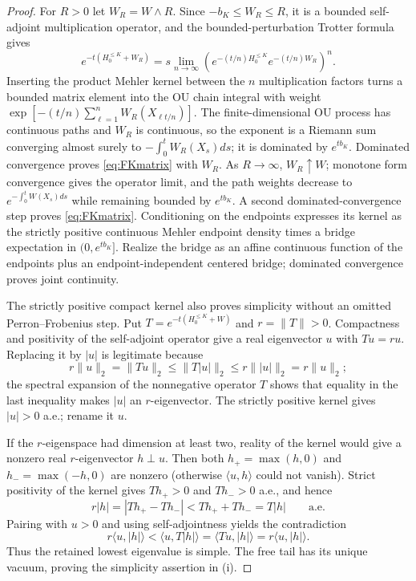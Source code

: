 \documentclass[11pt,a4paper]{article}
\theoremstyle{plain}
\theoremstyle{definition}
\begin{document}
\begin{proof}
For $R>0$ let $W_R=W\wedge R$.  Since $-b_K\le W_R\le R$, it is a bounded
self-adjoint multiplication operator, and the bounded-perturbation Trotter formula
gives
\begin{equation}
 e^{-t(H_0^{\le K}+W_R)}
 =s\!\!\lim_{n\to\infty}
   (e^{-(t/n)H_0^{\le K}}e^{-(t/n)W_R})^n .                        \label{eq:finite-trotter}
\end{equation}
Inserting the product Mehler kernel between the $n$ multiplication factors turns
a bounded matrix element into the OU chain integral with weight
$\exp[-(t/n)\sum_{\ell=1}^nW_R(X_{\ell t/n})]$.  The finite-dimensional OU
process has continuous paths and $W_R$ is continuous, so the exponent is a Riemann
sum converging almost surely to $-\int_0^tW_R(X_s)ds$; it is dominated by
$e^{tb_K}$.  Dominated convergence proves \eqref{eq:FKmatrix} with $W_R$.
As $R\to\infty$, $W_R\uparrow W$; monotone form convergence gives the operator
limit, and the path weights decrease to $e^{-\int_0^tW(X_s)ds}$ while remaining
bounded by $e^{tb_K}$.  A second dominated-convergence step proves
\eqref{eq:FKmatrix}.  Conditioning on the endpoints expresses its kernel as the
strictly positive continuous Mehler endpoint density times a bridge expectation in
$(0,e^{tb_K}]$.  Realize the bridge as an affine continuous function of the endpoints
plus an endpoint-independent centered bridge; dominated convergence proves joint
continuity.

The strictly positive compact kernel also proves simplicity without an omitted
Perron--Frobenius step.  Put $T=e^{-t(H_0^{\le K}+W)}$ and $r=\|T\|>0$.
Compactness and positivity of the self-adjoint operator give a real eigenvector
$u$ with $Tu=ru$.  Replacing it by $|u|$ is legitimate because
\[
 r\|u\|_2=\|Tu\|_2\le\|T|u|\|_2\le r\||u|\|_2=r\|u\|_2;
\]
the spectral expansion of the nonnegative operator $T$ shows that equality in
the last inequality makes $|u|$ an $r$-eigenvector.  The strictly positive
kernel gives $|u|>0$ a.e.; rename it $u$.

If the $r$-eigenspace had dimension at least two, reality of the kernel would
give a nonzero real $r$-eigenvector $h\perp u$.  Then both
$h_+=\max(h,0)$ and $h_-=\max(-h,0)$ are nonzero (otherwise
$\langle u,h\rangle$ could not vanish).  Strict positivity of the kernel gives
$Th_+>0$ and $Th_->0$ a.e., and hence
\[
 r|h|=|Th_+-Th_-|<Th_++Th_-=T|h|\qquad\text{a.e.}
\]
Pairing with $u>0$ and using self-adjointness yields the contradiction
\[
 r\langle u,|h|\rangle
 <\langle u,T|h|\rangle
 =\langle Tu,|h|\rangle
 =r\langle u,|h|\rangle.
\]
Thus the retained lowest eigenvalue is simple.  The free tail has its unique
vacuum, proving the simplicity assertion in (i).


\end{proof}
\end{document}
